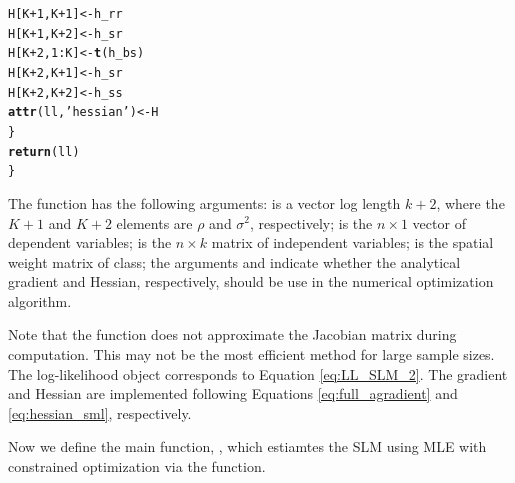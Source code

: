 \documentclass[english,12pt]{book}\usepackage[]{graphicx}\usepackage[]{xcolor}
\makeatletter
\newcommand{\hlnum}[1]{\textcolor[rgb]{0.686,0.059,0.569}{#1}}%
\newcommand{\hlstr}[1]{\textcolor[rgb]{0.192,0.494,0.8}{#1}}%
\newcommand{\hlopt}[1]{\textcolor[rgb]{0,0,0}{#1}}%
\newcommand{\hlstd}[1]{\textcolor[rgb]{0.345,0.345,0.345}{#1}}%
\newcommand{\hlkwb}[1]{\textcolor[rgb]{0.69,0.353,0.396}{#1}}%
\newcommand{\hlkwd}[1]{\textcolor[rgb]{0.737,0.353,0.396}{\textbf{#1}}}%
\newenvironment{kframe}{%
 \def\at@end@of@kframe{}%
 \ifinner\ifhmode%
  \def\at@end@of@kframe{\end{minipage}}%
  \begin{minipage}{\columnwidth}%
 \fi\fi%
 \def\FrameCommand##1{\hskip\@totalleftmargin \hskip-\fboxsep
 \colorbox{shadecolor}{##1}\hskip-\fboxsep
     \hskip-\linewidth \hskip-\@totalleftmargin \hskip\columnwidth}%
 \MakeFramed {\advance\hsize-\width
   \@totalleftmargin\z@ \linewidth\hsize
   \@setminipage}}%
 {\par\unskip\endMakeFramed%
 \at@end@of@kframe}
\newenvironment{knitrout}{}{} %
\makeatother
\begin{document}
\begin{knitrout}
\begin{kframe}
\begin{alltt}
    \hlstd{H[K} \hlopt{+} \hlnum{1}\hlstd{, K} \hlopt{+} \hlnum{1}\hlstd{]} \hlkwb{<-} \hlstd{h_rr}
    \hlstd{H[K} \hlopt{+} \hlnum{1}\hlstd{, K} \hlopt{+} \hlnum{2}\hlstd{]} \hlkwb{<-} \hlstd{h_sr}
    \hlstd{H[K} \hlopt{+} \hlnum{2}\hlstd{,} \hlnum{1}\hlopt{:}\hlstd{K]}   \hlkwb{<-} \hlkwd{t}\hlstd{(h_bs)}
    \hlstd{H[K} \hlopt{+} \hlnum{2}\hlstd{, K} \hlopt{+} \hlnum{1}\hlstd{]} \hlkwb{<-} \hlstd{h_sr}
    \hlstd{H[K} \hlopt{+} \hlnum{2}\hlstd{, K} \hlopt{+} \hlnum{2}\hlstd{]} \hlkwb{<-} \hlstd{h_ss}
    \hlkwd{attr}\hlstd{(ll,} \hlstr{'hessian'}\hlstd{)} \hlkwb{<-} \hlstd{H}
  \hlstd{\}}
  \hlkwd{return}\hlstd{(ll)}
\hlstd{\}}
\end{alltt}
\end{kframe}
\end{knitrout}

The function  has the following arguments:  is a vector log length $k + 2$, where the $K + 1$ and $K + 2$ elements are $\rho$ and $\sigma^2$, respectively;  is the $n\times 1$ vector of dependent variables;  is the $n\times k$ matrix of independent variables;  is the spatial weight matrix of  class; the arguments  and  indicate whether the analytical gradient and Hessian, respectively, should be use in the numerical optimization algorithm. 

Note that the function does not approximate the Jacobian matrix during computation. This may not be the most efficient method for large sample sizes. The log-likelihood object  corresponds to Equation \eqref{eq:LL_SLM_2}. The gradient and Hessian are implemented following Equations \eqref{eq:full_agradient} and \eqref{eq:hessian_sml}, respectively.


Now we define the main function, , which estiamtes the SLM using MLE with constrained optimization via the  function.
\end{document}
